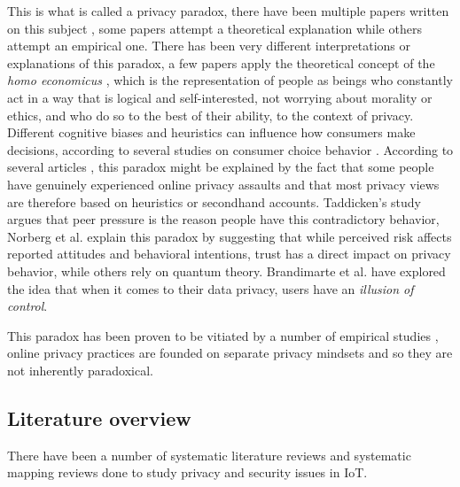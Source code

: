 \documentclass[conference]{IEEEtran}
\begin{document}
This is what is called a privacy paradox, there have been multiple papers
written on this subject \cite{solove2021myth, WilliamsPrivacy, lee2021investigating, goad2021privacy, gerber2018explaining},
some papers attempt a theoretical explanation while others attempt an empirical one.
There has been very different interpretations or explanations of this paradox,
a few papers \cite{wilson2012unpacking, warshaw2015can, lee2015privacy} apply the theoretical concept of the \textit{homo economicus} \cite{zak2008moral},
which is the representation of people as beings who constantly act in a way
that is logical and self-interested, not worrying about morality or ethics, and
who do so to the best of their ability, to the context of privacy.
Different cognitive biases and heuristics can influence how consumers make decisions,
according to several studies on consumer choice behavior \cite{acquisti2007can, knijnenburg2013dimensionality, wakefield2013influence, flender2012type}.
According to several articles \cite{dienlin2015privacy, baek2014solving}, this paradox might be explained by the
fact that some people have genuinely experienced online privacy assaults
and that most privacy views are therefore based on heuristics or secondhand accounts.
Taddicken's study \cite{taddicken2014privacy} argues that peer pressure is the reason people have this contradictory behavior,
Norberg et al. \cite{norberg2007privacy} explain this paradox by suggesting that while perceived
risk affects reported attitudes and behavioral intentions, trust has a direct
impact on privacy behavior, while others \cite{flender2012type, kokolakis2017privacy} rely on quantum theory.
Brandimarte et al. \cite{brandimarte2013misplaced} have explored the idea that when it comes to their
data privacy, users have an \textit{illusion of control}.

This paradox has been proven to be vitiated by a number of empirical studies \cite{dienlin2015privacy, xie2019consumers, SCHWAIG20131, sannon2018privacy},
online privacy practices are founded on separate privacy mindsets and so they are not inherently paradoxical.

\subsection{Literature overview}

There have been a number of systematic literature reviews \cite{shi2020applications, atlam2020iot, LoukilPrivacy, SICARI2015146, vcolakovic2018internet, chitanya2018robustness, chanal2020security, LinSurvey, Kraijaksurvey}
and systematic mapping reviews \cite{porras2018security, ahmed2019aspects}
done to study privacy and security issues in IoT.
\end{document}
